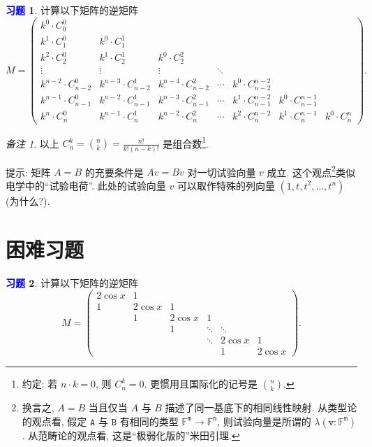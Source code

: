 \documentclass[11pt]{ctexart}
\theoremstyle{definition}
\numberwithin{equation}{section}
\theoremstyle{definition}
\newtheorem{exercise}{\textcolor{blue}{习题}}
\theoremstyle{remark}
\newtheorem*{remark}{备注}
\begin{document}
\begin{exercise}
    计算以下矩阵的逆矩阵
    \begin{equation}
        M=\begin{pmatrix}
            k^{0} \cdot C_{0}^{0} &  &  &  &  &  & \\[6pt]
            k^{1} \cdot C_{1}^{0} & k^{0} \cdot C_{1}^{1} &  &  &  &  & \\[6pt]
            k^{2} \cdot C_{2}^{0} & k^{1} \cdot C_{2}^{1} & k^{0} \cdot C_{2}^{2} &  &  &  & \\[6pt]
            \vdots  & \vdots  & \vdots  & \ddots  &  &  & \\[6pt]
            k^{n-2} \cdot C_{n-2}^{0} & k^{n-3} \cdot C_{n-2}^{1} & k^{n-4} \cdot C_{n-2}^{2} & \cdots  & k^{0} \cdot C_{n-2}^{n-2} &  & \\[6pt]
            k^{n-1} \cdot C_{n-1}^{0} & k^{n-2} \cdot C_{n-1}^{1} & k^{n-3} \cdot C_{n-1}^{2} & \cdots  & k^{1} \cdot C_{n-1}^{n-2} & k^{0} \cdot C_{n-1}^{n-1} & \\[6pt]
            k^{n} \cdot C_{n}^{0} & k^{n-1} \cdot C_{n}^{1} & k^{n-2} \cdot C_{n}^{2} & \cdots  & k^{2} \cdot C_{n}^{n-2} & k^{1} \cdot C_{n}^{n-1} & k^{0} \cdot C_{n}^{n}
        \end{pmatrix}.
    \end{equation}
\end{exercise}

\begin{remark}
    以上 $C_n^k=\binom{n}{k}=\frac{n!}{k!(n-k)!}$ 是组合数\footnote{约定: 若 $n\cdot k=0$, 则 $C_n^k=0$. 更惯用且国际化的记号是 $\binom nk$. }. 
    
    提示: 矩阵 $A=B$ 的充要条件是 $Av=Bv$ 对一切试验向量 $v$ 成立. 这个观点\footnote{换言之, $A=B$ 当且仅当 $A$ 与 $B$ 描述了同一基底下的相同线性映射. 从类型论的观点看, 假定 $\mathtt A$ 与 $\mathtt B$ 有相同的类型 $\mathtt{\mathbb F^m\to \mathbb F^n}$, 则试验向量是所谓的 $\mathtt{\lambda (v:\mathbb F^m)}$. 从范畴论的观点看, 这是``极弱化版的''米田引理.}类似电学中的``试验电荷''. 此处的试验向量 $v$ 可以取作特殊的列向量 $(1,t,t^2,\ldots, t^n)$ (为什么?). 
\end{remark}

\newpage

\section{困难习题}

\begin{exercise}
    计算以下矩阵的逆矩阵
    \begin{equation}
        M=\begin{pmatrix}
            2\cos x & 1 &  &  &  & \\
            1 & 2\cos x & 1 &  &  & \\
             & 1 & 2\cos x & 1 &  & \\
             &  & 1 & \ddots  & \ddots  & \\
             &  &  & \ddots  & 2\cos x & 1\\
             &  &  &  & 1 & 2\cos x
            \end{pmatrix}.
    \end{equation}
\end{exercise}
\end{document}
